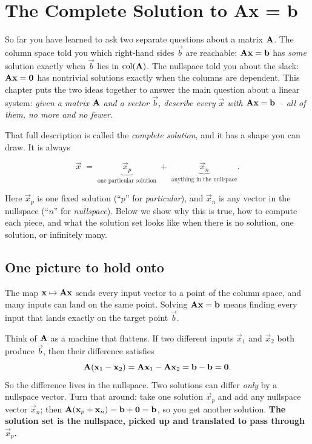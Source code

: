 \chapter{The Complete Solution to Ax = b}

So far you have learned to ask two separate questions about a matrix $\mathbf{A}$. The
column space told you which right-hand sides $\vec{b}$ are reachable: $\mathbf{A}\mathbf{x}=\mathbf{b}$
has \emph{some} solution exactly when $\vec{b}$ lies in $\operatorname{col}(\mathbf{A})$. The nullspace told
you about the slack: $\mathbf{A}\mathbf{x}=\mathbf{0}$ has nontrivial solutions exactly when the
columns are dependent. This chapter puts the two ideas together to answer the main
question about a linear system: \emph{given a matrix $\mathbf{A}$
and a vector $\vec{b}$, describe every $\vec{x}$ with $\mathbf{A}\mathbf{x}=\mathbf{b}$ -- all of
them, no more and no fewer.}

That full description is called the \emph{complete solution}, and it has a shape you can
draw. It is always

\[
  \vec{x} \;=\; \underbrace{\vec{x}_p}_{\text{one particular solution}}
        \;+\; \underbrace{\vec{x}_n}_{\text{anything in the nullspace}}.
\]

Here $\vec{x}_p$ is one fixed solution (``$p$'' for \emph{particular}), and $\vec{x}_n$
is any vector in the nullspace (``$n$'' for \emph{nullspace}). Below we show why this is
true, how to compute each piece, and what the solution set looks like when there is no
solution, one solution, or infinitely many.

\section{One picture to hold onto}

The map $\mathbf{x}\mapsto \mathbf{A}\mathbf{x}$ sends every input vector to a point of the
column space, and many inputs can land on the same point. Solving $\mathbf{A}\mathbf{x}=\mathbf{b}$
means finding every input that lands exactly on the target point $\vec{b}$.

\begin{intuitionbox}
Think of $\mathbf{A}$ as a machine that flattens. If two different inputs $\vec{x}_1$ and
$\vec{x}_2$ both produce $\vec{b}$, then their difference satisfies
\[
  \mathbf{A}(\mathbf{x}_1-\mathbf{x}_2)=\mathbf{A}\mathbf{x}_1-\mathbf{A}\mathbf{x}_2=\mathbf{b}-\mathbf{b}=\mathbf{0}.
\]
So the difference lives in the nullspace. Two solutions can differ \emph{only} by a
nullspace vector. Turn that around: take one solution $\vec{x}_p$ and add any nullspace
vector $\vec{x}_n$; then $\mathbf{A}(\mathbf{x}_p+\mathbf{x}_n)=\mathbf{b}+\mathbf{0}=\mathbf{b}$, so you get
another solution. \textbf{The solution set is the nullspace, picked up and translated to
pass through $\vec{x}_p$.}
\end{intuitionbox}

